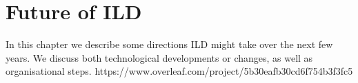 \chapter{Future of ILD}

In this chapter we describe some directions ILD might take over the next few years. We discuss both technological developments or changes, as well as organisational steps. https://www.overleaf.com/project/5b30eafb30cd6f754b3f3fc5